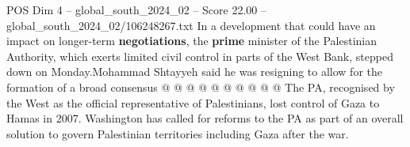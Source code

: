 \begin{textsample}{POS Dim 4 – global\_south\_2024\_02 – Score 22.00 – global\_south\_2024\_02/106248267.txt}
In a development that could have an impact on longer-term \textbf{negotiations}, the \textbf{prime} minister of the Palestinian Authority, which exerts limited civil control in parts of the West Bank, stepped down on Monday.Mohammad Shtayyeh said he was resigning to allow for the formation of a broad consensus @ @ @ @ @ @ @ @ @ @ The PA, recognised by the West as the official representative of Palestinians, lost control of Gaza to Hamas in 2007.
Washington has called for reforms to the PA as part of an overall solution to govern Palestinian territories including Gaza after the war.

\end{textsample}
